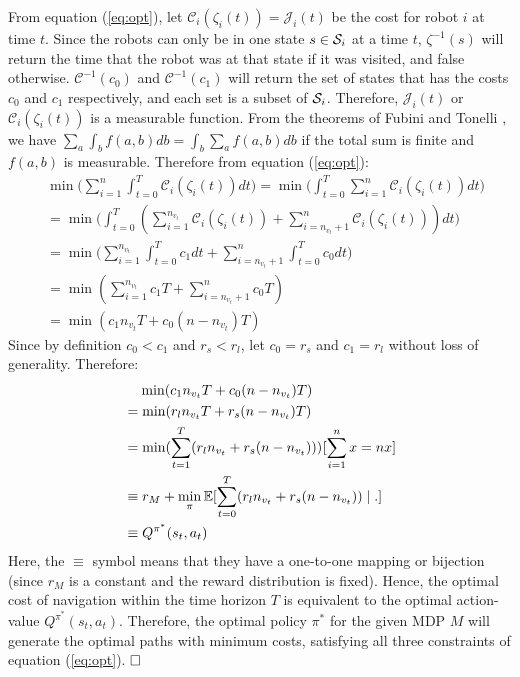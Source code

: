 \documentclass{article}
\begin{document}
From equation (\ref{eq:opt}), let $\mathcal{C}_i(\zeta_i(t)) = \mathcal{J}_i(t)$ be the cost for robot $i$ at time $t$. Since the robots can only be in one state $s \in \mathcal{S}_i$ at a time $t$, $\zeta^{-1}(s)$ will return the time that the robot was at that state if it was visited, and false otherwise. $\mathcal{C}^{-1}(c_0)$ and $\mathcal{C}^{-1}(c_1)$ will return the set of states that has the costs $c_0$ and $c_1$ respectively, and each set is a subset of $\mathcal{S}_i$. Therefore, $\mathcal{J}_i(t)$ or $\mathcal{C}_i(\zeta_i(t))$ is a measurable function. From the theorems of Fubini and Tonelli \citep{Royden2010RealAnalysis}, we have $\sum_a \int_b f(a,b)db = \int_b \sum_a f(a,b)db $ if the total sum is finite and $f(a,b)$ is measurable. Therefore from equation (\ref{eq:opt}):
\begin{align}
& \min \bigg( \sum_{i=1}^{n} \int_{t=0}^{T} \mathcal{C}_i (\zeta_i(t))dt \bigg) \nonumber = \min \bigg( \int_{t=0}^{T}  \sum_{i=1}^{n} \mathcal{C}_i (\zeta_i(t))dt \bigg) \nonumber \\
&=  \min \bigg( \int_{t=0}^{T} (\sum_{i=1}^{n_{v_t}} \mathcal{C}_i (\zeta_i(t)) + \sum_{i=n_{v_t}+1}^{n} \mathcal{C}_i (\zeta_i(t))) dt \bigg) \nonumber \\
&=  \min \bigg( \sum_{i=1}^{n_{v_t}} \int_{t=0}^{T} c_1dt + \sum_{i=n_{v_t}+1}^{n} \int_{t=0}^{T} c_0dt \bigg) \nonumber \\
&=  \min (\sum_{i=1}^{n_{v_t}} c_1 T+ \sum_{i=n_{v_t}+1}^{n} c_0 T) \nonumber \\
&=  \min (c_1n_{v_t}T + c_0(n-n_{v_t})T) 
\end{align}
Since by definition $c_0 < c_1$ and $r_s < r_l$, let $ c_0 = r_s$ and $c_1 = r_l$ without loss of generality. Therefore:
\begin{align}
&\phantom{=\ } \min (c_1n_{v_t}T + c_0(n-n_{v_t})T) \nonumber \\
&= \min (r_ln_{v_t} T+ r_s(n-n_{v_t}) T) \nonumber \\
&= \min (\sum_{t=1}^T(r_ln_{v_t} + r_s(n-n_{v_t}))) & \mathllap{[\sum_{i=1}^n x = nx]} \nonumber \\
&\equiv  r_M + \min_{\pi} \mathbb{E} [  \sum_{t=0}^T(r_l n_{v_t} +  r_s (n - n_{v_t})) \mid . ] \nonumber \\
&\equiv Q^{\pi^*}(s_t,a_t) 
\end{align}
Here, the $\equiv$ symbol means that they have a one-to-one mapping or bijection (since $r_M$ is a constant and the reward distribution is fixed). Hence, the optimal cost of navigation within the time horizon $T$ is equivalent to the optimal action-value $Q^{\pi^*}(s_t,a_t)$. Therefore, the optimal policy $\pi^*$ for the given MDP $M$ will generate the optimal paths with minimum costs, satisfying all three constraints of equation (\ref{eq:opt}). $\qed$
\end{document}

